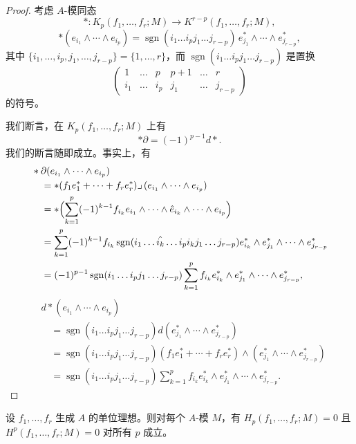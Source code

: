 \begin{proof}
考虑 $A$-模同态
\[
* \colon K_p(f_1,\dots,f_r;M)\to K^{r-p}(f_1,\dots,f_r;M),
\]
\[
*(e_{i_1}\wedge\cdots\wedge e_{i_p})=\operatorname{sgn}(i_1\dots i_pj_1\dots j_{r-p})\,e_{j_1}^{*}\wedge\cdots\wedge e_{j_{r-p}}^{*},
\]
其中 $\{i_1,\dots,i_p,j_1,\dots,j_{r-p}\}=\{1,\dots,r\}$，而 $\operatorname{sgn}(i_1\dots i_pj_1\dots j_{r-p})$ 是置换
\[
\begin{pmatrix}
1 & \dots & p & p+1 & \dots & r\\
i_1 & \dots & i_p & j_1 & \dots & j_{r-p}
\end{pmatrix}
\]
的符号。

我们断言，在 $K_p(f_1,\dots,f_r;M)$ 上有
\[
*\partial=(-1)^{p-1}d*.
\]
我们的断言随即成立。事实上，有
\[
\begin{aligned}
&*\partial(e_{i_1}\wedge\cdots\wedge e_{i_p})\\
&\quad=*(f_1e_1^{*}+\cdots+f_re_r^{*})\lrcorner\,(e_{i_1}\wedge\cdots\wedge e_{i_p})\\
&\quad=*\Bigl(\sum_{k=1}^{p}(-1)^{k-1}f_{i_k}e_{i_1}\wedge\cdots\wedge\hat{e}_{i_k}\wedge\cdots\wedge e_{i_p}\Bigr)\\
&\quad=\sum_{k=1}^{p}(-1)^{k-1}f_{i_k}
\operatorname{sgn}(i_1\dots\hat{i_k}\dots i_pi_kj_1\dots j_{r-p})e_{i_k}^{*}\wedge e_{j_1}^{*}\wedge\cdots\wedge e_{j_{r-p}}^{*}\\
&\quad=(-1)^{p-1}\operatorname{sgn}(i_1\dots i_pj_1\dots j_{r-p})
\sum_{k=1}^{p}f_{i_k}e_{i_k}^{*}\wedge e_{j_1}^{*}\wedge\cdots\wedge e_{j_{r-p}}^{*},
\end{aligned}
\]
\[
\begin{aligned}
&d*(e_{i_1}\wedge\cdots\wedge e_{i_p})\\
&\quad=\operatorname{sgn}(i_1\dots i_pj_1\dots j_{r-p})d(e_{j_1}^{*}\wedge\cdots\wedge e_{j_{r-p}}^{*})\\
&\quad=\operatorname{sgn}(i_1\dots i_pj_1\dots j_{r-p})(f_1e_1^{*}+\cdots+f_re_r^{*})\wedge(e_{j_1}^{*}\wedge\cdots\wedge e_{j_{r-p}}^{*})\\
&\quad=\operatorname{sgn}(i_1\dots i_pj_1\dots j_{r-p})\sum_{k=1}^{p}f_{i_k}e_{i_k}^{*}\wedge e_{j_1}^{*}\wedge\cdots\wedge e_{j_{r-p}}^{*}.
\end{aligned}
\]
\end{proof}

\begin{proposition}\label{it:2.4.2}
设 $f_1,\dots,f_r$ 生成 $A$ 的单位理想。则对每个 $A$-模 $M$，有 $H_p(f_1,\dots,f_r;M)=0$ 且 $H^p(f_1,\dots,f_r;M)=0$ 对所有 $p$ 成立。
\end{proposition}

